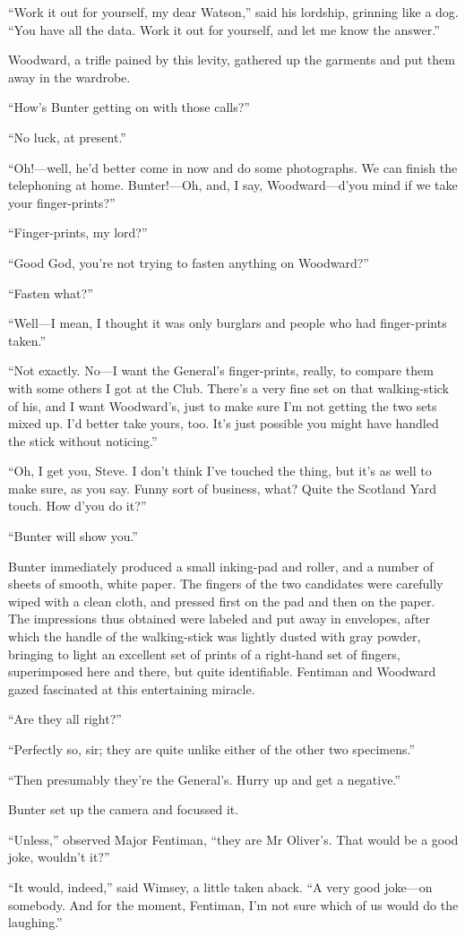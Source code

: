 \enquote{Work it out for yourself, my dear Watson,} said his lordship, grinning like a dog. \enquote{You have all the data. Work it out for yourself, and let me know the answer.}

Woodward, a trifle pained by this levity, gathered up the garments and put them away in the wardrobe.

\enquote{How's Bunter getting on with those calls?}

\enquote{No luck, at present.}

\enquote{Oh!---well, he'd better come in now and do some photographs. We can finish the telephoning at home. Bunter!---Oh, and, I say, Woodward\allowbreak---\allowbreak d'you mind if we take your finger-prints?}

\enquote{Finger-prints, my lord?}

\enquote{Good God, you're not trying to fasten anything on Woodward?}

\enquote{Fasten what?}

\enquote{Well\allowbreak---\allowbreak I mean, I thought it was only burglars and people who had finger-prints taken.}

\enquote{Not exactly. No\allowbreak---\allowbreak I want the General's finger-prints, really, to compare them with some others I got at the Club. There's a very fine set on that walking-stick of his, and I want Woodward's, just to make sure I'm not getting the two sets mixed up. I'd better take yours, too. It's just possible you might have handled the stick without noticing.}

\enquote{Oh, I get you, Steve. I don't think I've touched the thing, but it's as well to make sure, as you say. Funny sort of business, what? Quite the Scotland Yard touch. How d'you do it?}

\enquote{Bunter will show you.}

Bunter immediately produced a small inking-pad and roller, and a number of sheets of smooth, white paper. The fingers of the two candidates were carefully wiped with a clean cloth, and pressed first on the pad and then on the paper. The impressions thus obtained were labeled and put away in envelopes, after which the handle of the walking-stick was lightly dusted with gray powder, bringing to light an excellent set of prints of a right-hand set of fingers, superimposed here and there, but quite identifiable. Fentiman and Woodward gazed fascinated at this entertaining miracle.

\enquote{Are they all right?}

\enquote{Perfectly so, sir; they are quite unlike either of the other two specimens.}

\enquote{Then presumably they're the General's. Hurry up and get a negative.}

Bunter set up the camera and focussed it.

\enquote{Unless,} observed Major Fentiman, \enquote{they are Mr Oliver's. That would be a good joke, wouldn't it?}

\enquote{It would, indeed,} said Wimsey, a little taken aback. \enquote{A very good joke\allowbreak---\allowbreak on somebody. And for the moment, Fentiman, I'm not sure which of us would do the laughing.}

